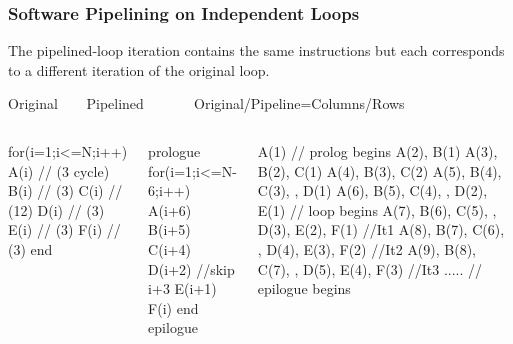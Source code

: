 \documentclass{beamer}
\renewcommand{\emph}[1]{\textcolor{structure}{#1}}
\newcommand{\emp}[1]{\textcolor{DikuRed}{ #1}}
\begin{document}
\begin{frame}[fragile,t]
    \frametitle{Software Pipelining on Independent Loops}

The pipelined-loop iteration contains the same instructions 
but each corresponds to a different iteration of the original loop.

\begin{block}{Original{\tt~~~~}Pipelined{\tt~~~~~~~}Original/Pipeline=Columns/Rows}\vspace{-2ex}
\begin{columns}
\begin{colorcode}[fontsize=\tiny]
for(i=1;i<=N;i++)
  A(i) // (3 cycle)
  B(i) // (3)
  C(i) // (12)
  D(i) // (3)
  E(i) // (3)
  F(i) // (3)
end
\end{colorcode}
\begin{colorcode}[fontsize=\tiny]
prologue
for(i=1;i<=N-6;i++)
  A(i+6)
  B(i+5)
  C(i+4)
  D(i+2) //\alert{skip i+3}
  E(i+1)
  F(i)
end
epilogue
\end{colorcode}
\begin{colorcode}[fontsize=\tiny]
\emp{A(1)}                                      // \emp{prolog begins}
\emp{A(2), B(1)} 
\emp{A(3), B(2), C(1)} 
\emp{A(4), B(3), C(2)} 
\emp{A(5), B(4), C(3),     , D(1)}
\emp{A(6), B(5), C(4),     , D(2), E(1)} // \emph{loop begins}
\emph{A(7), B(6), C(5),     , D(3), E(2), F(1)   //It1}
\emph{A(8), B(7), C(6),     , D(4), E(3), F(2)   //It2}
\emph{A(9), B(8), C(7),     , D(5), E(4), F(3)   //It3}
\emp{.....                                     // epilogue begins} 
\end{colorcode}
\end{columns}
\end{block}
\smallskip



\end{frame}
\end{document}

